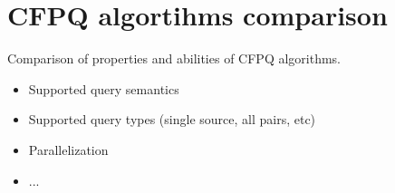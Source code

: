 \section{CFPQ algortihms comparison}

Comparison of properties and abilities of CFPQ algorithms.
\begin{itemize}
\item Supported query semantics
\item Supported query types (single source, all pairs, etc)
\item Parallelization
\item ...
\end{itemize}
